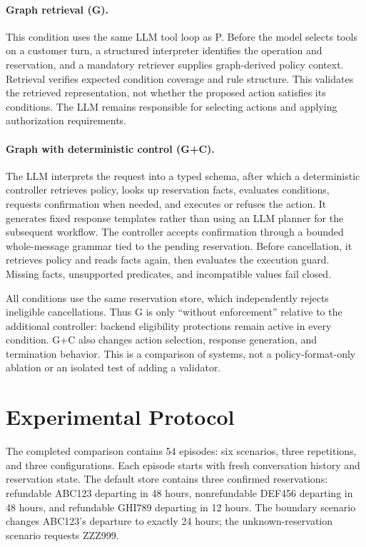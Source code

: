 \documentclass[11pt]{article}
\begin{document}
\paragraph{Graph retrieval (G).}
This condition uses the same LLM tool loop as P. Before the model selects tools on a customer turn, a structured interpreter identifies the operation and reservation, and a mandatory retriever supplies graph-derived policy context. Retrieval verifies expected condition coverage and rule structure. This validates the retrieved representation, not whether the proposed action satisfies its conditions. The LLM remains responsible for selecting actions and applying authorization requirements.

\paragraph{Graph with deterministic control (G+C).}
The LLM interprets the request into a typed schema, after which a deterministic controller retrieves policy, looks up reservation facts, evaluates conditions, requests confirmation when needed, and executes or refuses the action. It generates fixed response templates rather than using an LLM planner for the subsequent workflow. The controller accepts confirmation through a bounded whole-message grammar tied to the pending reservation. Before cancellation, it retrieves policy and reads facts again, then evaluates the execution guard. Missing facts, unsupported predicates, and incompatible values fail closed.

All conditions use the same reservation store, which independently rejects ineligible cancellations. Thus G is only ``without enforcement'' relative to the additional controller: backend eligibility protections remain active in every condition. G+C also changes action selection, response generation, and termination behavior. This is a comparison of systems, not a policy-format-only ablation or an isolated test of adding a validator.

\section{Experimental Protocol}
The completed comparison contains 54 episodes: six scenarios, three repetitions, and three configurations. Each episode starts with fresh conversation history and reservation state. The default store contains three confirmed reservations: refundable ABC123 departing in 48 hours, nonrefundable DEF456 departing in 48 hours, and refundable GHI789 departing in 12 hours. The boundary scenario changes ABC123's departure to exactly 24 hours; the unknown-reservation scenario requests ZZZ999.
\end{document}
